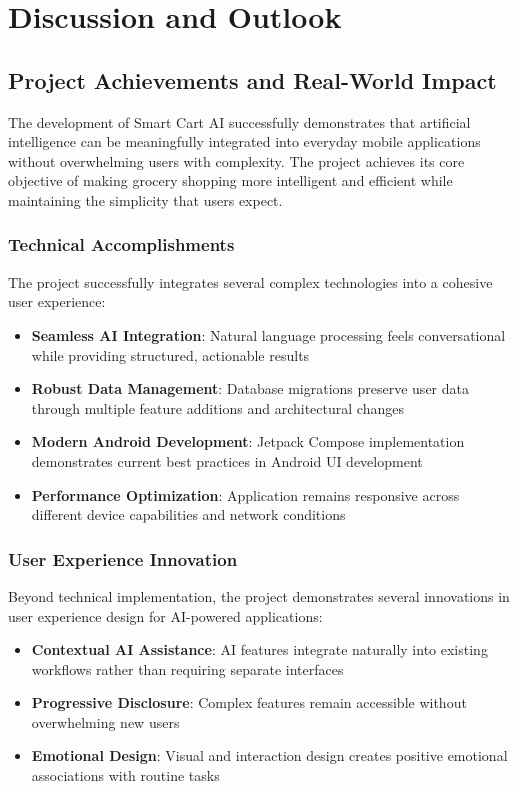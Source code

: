 \documentclass[11pt,a4paper]{article}
\begin{document}
\section{Discussion and Outlook}

\subsection{Project Achievements and Real-World Impact}

The development of Smart Cart AI successfully demonstrates that artificial intelligence can be meaningfully integrated into everyday mobile applications without overwhelming users with complexity. The project achieves its core objective of making grocery shopping more intelligent and efficient while maintaining the simplicity that users expect.

\subsubsection{Technical Accomplishments}

The project successfully integrates several complex technologies into a cohesive user experience:

\begin{itemize}
    \item \textbf{Seamless AI Integration}: Natural language processing feels conversational while providing structured, actionable results
    \item \textbf{Robust Data Management}: Database migrations preserve user data through multiple feature additions and architectural changes
    \item \textbf{Modern Android Development}: Jetpack Compose implementation demonstrates current best practices in Android UI development
    \item \textbf{Performance Optimization}: Application remains responsive across different device capabilities and network conditions
\end{itemize}

\subsubsection{User Experience Innovation}

Beyond technical implementation, the project demonstrates several innovations in user experience design for AI-powered applications:

\begin{itemize}
    \item \textbf{Contextual AI Assistance}: AI features integrate naturally into existing workflows rather than requiring separate interfaces
    \item \textbf{Progressive Disclosure}: Complex features remain accessible without overwhelming new users
    \item \textbf{Emotional Design}: Visual and interaction design creates positive emotional associations with routine tasks
\end{itemize}
\end{document}
